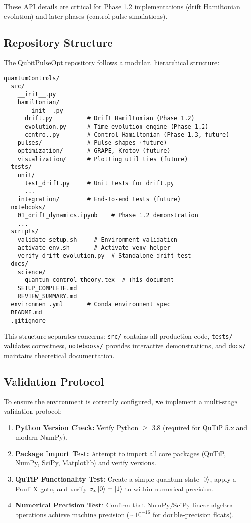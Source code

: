 \documentclass[11pt,a4paper]{article}
\theoremstyle{definition}
\theoremstyle{remark}
\newcommand{\paulix}{\sigma_x}
\begin{document}
These API details are critical for Phase 1.2 implementations (drift Hamiltonian evolution) and later phases (control pulse simulations).

\subsection{Repository Structure}

The QubitPulseOpt repository follows a modular, hierarchical structure:

\begin{verbatim}
quantumControls/
  src/
    __init__.py
    hamiltonian/
      __init__.py
      drift.py          # Drift Hamiltonian (Phase 1.2)
      evolution.py      # Time evolution engine (Phase 1.2)
      control.py        # Control Hamiltonian (Phase 1.3, future)
    pulses/             # Pulse shapes (future)
    optimization/       # GRAPE, Krotov (future)
    visualization/      # Plotting utilities (future)
  tests/
    unit/
      test_drift.py     # Unit tests for drift.py
      ...
    integration/        # End-to-end tests (future)
  notebooks/
    01_drift_dynamics.ipynb    # Phase 1.2 demonstration
    ...
  scripts/
    validate_setup.sh     # Environment validation
    activate_env.sh       # Activate venv helper
    verify_drift_evolution.py  # Standalone drift test
  docs/
    science/
      quantum_control_theory.tex  # This document
    SETUP_COMPLETE.md
    REVIEW_SUMMARY.md
  environment.yml       # Conda environment spec
  README.md
  .gitignore
\end{verbatim}

This structure separates concerns: \texttt{src/} contains all production code, \texttt{tests/} validates correctness, \texttt{notebooks/} provides interactive demonstrations, and \texttt{docs/} maintains theoretical documentation.

\subsection{Validation Protocol}

To ensure the environment is correctly configured, we implement a multi-stage validation protocol:

\begin{enumerate}[label=\textbf{Stage \arabic*:}]
    \item \textbf{Python Version Check:} Verify Python $\geq$ 3.8 (required for QuTiP 5.x and modern NumPy).
    \item \textbf{Package Import Test:} Attempt to import all core packages (QuTiP, NumPy, SciPy, Matplotlib) and verify versions.
    \item \textbf{QuTiP Functionality Test:} Create a simple quantum state $\ket{0}$, apply a Pauli-X gate, and verify $\paulix \ket{0} = \ket{1}$ to within numerical precision.
    \item \textbf{Numerical Precision Test:} Confirm that NumPy/SciPy linear algebra operations achieve machine precision ($\sim 10^{-16}$ for double-precision floats).
\end{enumerate}
\end{document}
